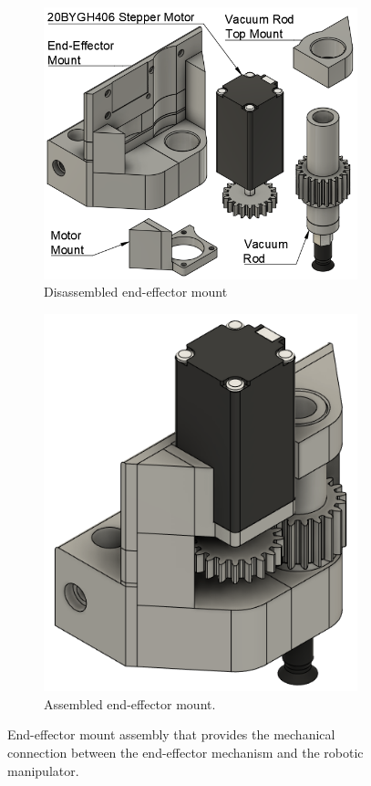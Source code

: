 \begin{figure}[!ht]
	\centering
	\begin{subfigure}{.59\textwidth}
		\centering
		\includegraphics[width=0.8\linewidth]{figures/end-effector-disassembled.png}
		\caption{Disassembled end-effector mount}
		\label{fig:end-effector-disassembled}
	\end{subfigure}%
	\begin{subfigure}{.4\textwidth}
		\centering
		\includegraphics[width=0.8\linewidth]{figures/end-effector-assembled.png}
		\caption{Assembled end-effector mount.}
		\label{fig:end-effector-assembled}
	\end{subfigure}%
	\caption{End-effector mount assembly that provides the mechanical connection between the end-effector mechanism and the robotic manipulator.}
	\label{fig:end-effector-assembly}
\end{figure}

